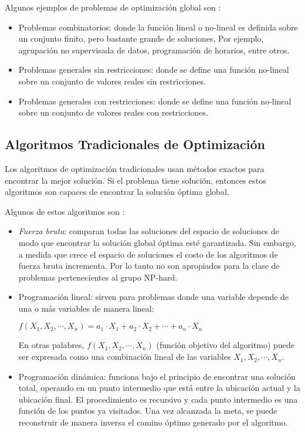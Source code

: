     Algunos ejemplos de problemas de optimización global son \cite{GO_2}:
\begin{itemize}
    \item Problemas combinatorios: donde la función lineal o no-lineal es definida
sobre un conjunto finito, pero bastante grande de soluciones, Por ejemplo,
agrupación no supervisada de datos, programación de horarios, entre otros.
    \item Problemas generales sin restricciones: donde se define una función
no-lineal sobre un conjunto de valores reales sin restricciones.
    \item Problemas generales con restricciones: donde se define una función
no-lineal sobre un conjunto de valores reales con restricciones.
\end{itemize}

\subsection{Algoritmos Tradicionales de Optimización}

    Los algoritmos de optimización tradicionales usan métodos exactos para
encontrar la mejor solución. Si el problema tiene solución, entonces estos algoritmos
son capaces de encontrar la solución óptima global.

    Algunos de estos algoritmos son \cite{TA_1}:
\begin{itemize}
    \item \emph{Fuerza bruta}: comparan todas las soluciones del espacio de
soluciones de modo que encontrar la solución global óptima esté garantizada. Sin
embargo, a medida que crece el espacio de soluciones el costo de los algoritmos
de fuerza bruta incrementa. Por lo tanto no son apropiados para la clase de
problemas pertenecientes al grupo NP-hard.
    \item Programación lineal: sirven para problemas donde una variable depende
de una o más variables de manera lineal:
\begin{center}
    $f(X_1, X_2, \cdots, X_n) = a_1 \cdot X_1 + a_2 \cdot X_2 + \cdots + a_n \cdot X_n$
\end{center}

    En otras palabres, $f(X_1, X_2, \cdots, X_n)$ (función objetivo del algoritmo)
puede ser expresada como una combinación lineal de las variables
$X_1, X_2, \cdots, X_n$. 
    \item Programación dinámica: funciona bajo el principio de encontrar una
solución total, operando en un punto intermedio que está entre la ubicación actual
y la ubicación final. El procedimiento es recursivo y cada punto intermedio es una
función de los puntos ya visitados. Una vez alcanzada la meta, se puede reconstruir
de manera inversa el camino óptimo generado por el algoritmo.
\end{itemize}

